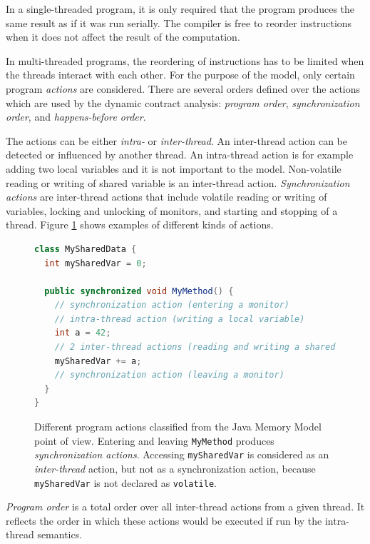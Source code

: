 In a single-threaded program, it is only required that the program produces the
same result as if it was run serially. The compiler is free to reorder
instructions when it does not affect the result of the computation.

In multi-threaded programs, the reordering of instructions has to be limited
when the threads interact with each other. For the purpose of the model, only
certain program \emph{actions} are considered. There are several orders defined
over the actions which are used by the dynamic contract analysis: \emph{program
order}, \emph{synchronization order}, and \emph{happens-before order}.

The actions can be either \emph{intra-} or \emph{inter-thread}. An inter-thread
action can be detected or influenced by another thread. An intra-thread action
is for example adding two local variables and it is not important to the model.
Non-volatile reading or writing of shared variable is an inter-thread action.
\emph{Synchronization actions} are inter-thread actions that include volatile
reading or writing of variables, locking and unlocking of monitors, and starting
and stopping of a thread. Figure \ref{threadActions} shows examples of different
kinds of actions.

\begin{figure}[hbt]
    \label{threadActions}
\begin{lstlisting}[language=java]
class MySharedData {
  int mySharedVar = 0;

  public synchronized void MyMethod() {
    // synchronization action (entering a monitor)
    // intra-thread action (writing a local variable)
    int a = 42;
    // 2 inter-thread actions (reading and writing a shared variable) 
    mySharedVar += a;
    // synchronization action (leaving a monitor)
  }
}
\end{lstlisting}
    \caption{Different program actions classified from the Java Memory Model
    point of view. Entering and leaving \texttt{MyMethod} produces
    \emph{synchronization actions}. Accessing \texttt{mySharedVar} is considered
    as an \emph{inter-thread} action, but not as a synchronization action,
    because \texttt{mySharedVar} is not declared as \texttt{volatile}.}
\end{figure}


\emph{Program order} is a total order over all inter-thread actions from a given
thread. It reflects the order in which these actions would be executed if
run by the intra-thread semantics. 

